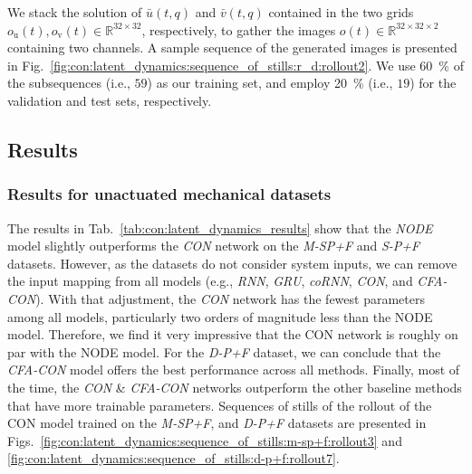 We stack the solution of $\bar{u}(t, q)$ and $\bar{v}(t,q)$ contained in the two grids $o_\mathrm{u}(t), o_\mathrm{v}(t) \in \mathbb{R}^{32 \times 32}$, respectively, to gather the images $o(t) \in \mathbb{R}^{32 \times 32 \times 2}$ containing two channels.
A sample sequence of the generated images is presented in Fig.~\ref{fig:con:latent_dynamics:sequence_of_stills:r_d:rollout2}.
We use \SI{60}{\percent} of the subsequences (i.e., $59$) as our training set, and employ \SI{20}{\percent} (i.e., $19$) for the validation and test sets, respectively. 

\subsection{Results}

\subsubsection{Results for unactuated mechanical datasets}
The results in Tab.~\ref{tab:con:latent_dynamics_results} show that the \emph{NODE} model slightly outperforms the \emph{CON} network on the \emph{M-SP+F} and \emph{S-P+F} datasets. However, as the datasets do not consider system inputs, we can remove the input mapping from all models (e.g., \emph{RNN}, \emph{GRU}, \emph{coRNN}, \emph{CON}, and \emph{CFA-CON}). With that adjustment, the \emph{CON} network has the fewest parameters among all models, particularly two orders of magnitude less than the NODE model. Therefore, we find it very impressive that the CON network is roughly on par with the NODE model. For the \emph{D-P+F} dataset, we can conclude that the \emph{CFA-CON} model offers the best performance across all methods. Finally, most of the time, the \emph{CON} \& \emph{CFA-CON} networks outperform the other baseline methods that have more trainable parameters.
Sequences of stills of the rollout of the \gls{CON} model trained on the \emph{M-SP+F}, and \emph{D-P+F} datasets are presented in Figs.~\ref{fig:con:latent_dynamics:sequence_of_stills:m-sp+f:rollout3} and \ref{fig:con:latent_dynamics:sequence_of_stills:d-p+f:rollout7}.

